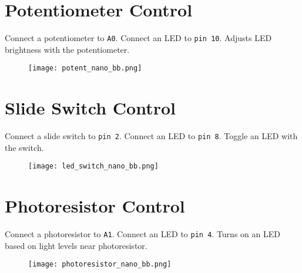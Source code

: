 \documentclass{article}
\begin{document}
\section*{Potentiometer Control}
\begin{minipage}{\textwidth}
Connect a potentiometer to \texttt{A0}. Connect an LED to \texttt{pin 10}. Adjusts LED brightness with the potentiometer.
\end{minipage}
\begin{figure}[h!]
\centering
\texttt{[image: potent\_nano\_bb.png]}
\end{figure}

\section*{Slide Switch Control}
\begin{minipage}{\textwidth}
Connect a slide switch to \texttt{pin 2}. Connect an LED to \texttt{pin 8}. Toggle an LED with the switch.
\end{minipage}
\begin{figure}[h!]
\centering
\texttt{[image: led\_switch\_nano\_bb.png]}
\end{figure}
\newpage

\section*{Photoresistor Control}
\begin{minipage}{\textwidth}
Connect a photoresistor to \texttt{A1}. Connect an LED to \texttt{pin 4}. Turns on an LED based on light levels near photoresistor.
\end{minipage}
\begin{figure}[h!]
\centering
\texttt{[image: photoresistor\_nano\_bb.png]}
\end{figure}
\newpage
\end{document}
